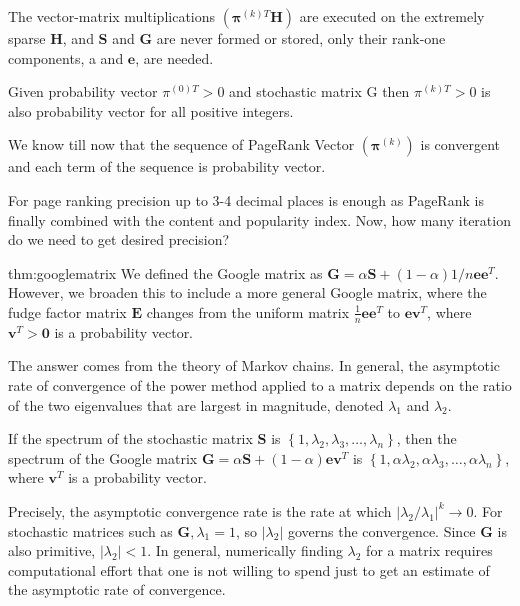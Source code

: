 \noindent The vector-matrix multiplications $\left(\boldsymbol{\pi}^{(k) T} \mathbf{H}\right)$ are executed on the extremely sparse $\mathbf{H}$, and $\mathbf{S}$ and $\mathbf{G}$ are never formed or stored, only their rank-one components, a and $\mathbf{e}$, are needed.\\
	
\begin{thm}[]{}
	Given probability vector $\pi^{(0)T}>0$ and stochastic matrix G then $\pi^{(k)T}>0$ is also probability vector for all positive integers.
\end{thm}
	
\noindent We know till now that the sequence of PageRank Vector $(\boldsymbol{\pi}^{(k)})$ is convergent and each term of the sequence is probability vector.
	
\noindent For page ranking precision up to 3-4 decimal places is enough as PageRank is finally combined with the content and popularity index. Now, how many iteration do we need to get desired precision?
	
\begin{thm}{thm:googlematrix}
	We defined the Google matrix as $\mathbf{G}=\alpha \mathbf{S}+(1-\alpha) 1 / n \mathbf{e e}^{T}$. However, we broaden this to include a more general Google matrix, where the fudge factor matrix $\mathbf{E}$ changes from the uniform matrix $\frac{1}{n} \mathbf{e e}^{T}$ to $\mathbf{e v}^{T}$, where $\mathbf{v}^{T}>\mathbf{0}$ is a probability vector.
\end{thm}
	
\noindent The answer comes from the theory of Markov chains. In general, the asymptotic rate of convergence of the power method applied to a matrix depends on the ratio of the two eigenvalues that are largest in magnitude, denoted $\lambda_{1}$ and $\lambda_{2}$. 

\begin{thm}[]{}
If the spectrum of the stochastic matrix $\mathbf{S}$ is $\left\{1, \lambda_{2}, \lambda_{3}, \ldots, \lambda_{n}\right\}$, then the spectrum of the Google matrix $\mathbf{G}=\alpha \mathbf{S}+(1-\alpha) \mathbf{e v}^{T}$ is $\left\{1, \alpha \lambda_{2}, \alpha \lambda_{3}, \ldots, \alpha \lambda_{n}\right\}$, where $\mathbf{v}^{T}$ is a probability vector.
\end{thm}
	
\noindent Precisely, the asymptotic convergence rate is the rate at which $\left|\lambda_{2} / \lambda_{1}\right|^{k} \rightarrow 0$. For stochastic matrices such as $\mathbf{G}, \lambda_{1}=1$, so $\left|\lambda_{2}\right|$ governs the convergence. Since $\mathbf{G}$ is also primitive, $\left|\lambda_{2}\right|<1$. In general, numerically finding $\lambda_{2}$ for a matrix requires computational effort that one is not willing to spend just to get an estimate of the asymptotic rate of convergence.\\
	
